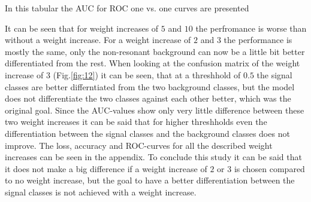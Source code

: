 
In this tabular the AUC for ROC one vs. one curves are presented



It can be seen that for weight increases of $5$ and $10$ the perfromance is worse than without a weight increase. For a weight increase of $2$ and $3$ the performance is mostly the same, only
the non-resonant background can now be a little bit better differentiated from the rest. When looking at the confusion matrix of the weight increase of $3$ (Fig.\ref{fig:12}) it can be seen, that at a threshhold of $0.5$
the signal classes are better differntiated from the two background classes, but the model does not differentiate the two classes against each other better, which was the original goal.
Since the AUC-values show only very little difference between these two weight increases it can be said that for higher threshholds even the differentiation between the signal classes and the background classes
does not improve. The loss, accuracy and ROC-curves for all the described weight increases can be seen in the appendix. To conclude this study it can be said that it does not make a big difference if a weight
increase of $2$ or $3$ is chosen compared to no weight increase, but the goal to have a better differentiation between the signal classes is not achieved with a weight increase. \\

